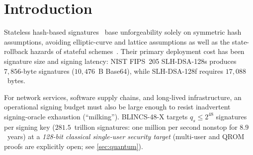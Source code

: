\documentclass[11pt,a4paper]{article}
\theoremstyle{definition}
\theoremstyle{remark}
\newcommand{\BLINCS}{\textsf{BLINCS-48-X}}
\begin{document}
\section{Introduction}
\label{sec:intro}

Stateless hash-based signatures~\cite{bernstein2015sphincs,bernstein2019sphincsplus,nist2024fips205} base unforgeability solely on symmetric hash assumptions, avoiding elliptic-curve and lattice assumptions as well as the state-rollback hazards of stateful schemes~\cite{buchmann2011xmss,shrincs2025}. Their primary deployment cost has been signature size and signing latency: NIST FIPS~205 \textsf{SLH-DSA-128s} produces $7{,}856$-byte signatures ($10{,}476$~B Base64), while \textsf{SLH-DSA-128f} requires $17{,}088$~bytes.

For network services, software supply chains, and long-lived infrastructure, an operational signing budget must also be large enough to resist inadvertent signing-oracle exhaustion (``milking''). \BLINCS{} targets $q_s \le 2^{48}$ signatures per signing key ($281.5$~trillion signatures: one million per second nonstop for $8.9$~years) at a \emph{128-bit classical single-user security target} (multi-user and QROM proofs are explicitly open; see \cref{sec:quantum}).
\end{document}
